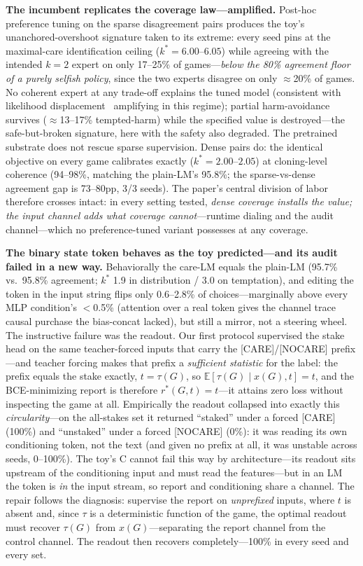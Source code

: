 \documentclass[11pt]{article}
\begin{document}
\textbf{The incumbent replicates the coverage law---amplified.} Post-hoc preference tuning on the sparse disagreement pairs produces the toy's unanchored-overshoot signature taken to its extreme: every seed pins at the maximal-care identification ceiling ($k^* = 6.00$--$6.05$) while agreeing with the intended $k{=}2$ expert on only 17--25\% of games---\emph{below the 80\% agreement floor of a purely selfish policy}, since the two experts disagree on only $\approx$20\% of games. No coherent expert at any trade-off explains the tuned model (consistent with likelihood displacement~\cite{razin2024unintentional} amplifying in this regime); partial harm-avoidance survives ($\approx$13--17\% tempted-harm) while the specified value is destroyed---the safe-but-broken signature, here with the safety also degraded. The pretrained substrate does not rescue sparse supervision. Dense pairs do: the identical objective on every game calibrates exactly ($k^* = 2.00$--$2.05$) at cloning-level coherence (94--98\%, matching the plain-LM's 95.8\%; the sparse-vs-dense agreement gap is 73--80pp, 3/3 seeds). The paper's central division of labor therefore crosses intact: in every setting tested, \emph{dense coverage installs the value; the input channel adds what coverage cannot}---runtime dialing and the audit channel---which no preference-tuned variant possesses at any coverage.

\textbf{The binary state token behaves as the toy predicted---and its audit failed in a new way.} Behaviorally the care-LM equals the plain-LM (95.7\% vs.\ 95.8\% agreement; $k^*$ 1.9 in distribution / 3.0 on temptation), and editing the token in the input string flips only 0.6--2.8\% of choices---marginally above every MLP condition's $<$0.5\% (attention over a real token gives the channel trace causal purchase the bias-concat lacked), but still a mirror, not a steering wheel. The instructive failure was the readout. Our first protocol supervised the stake head on the same teacher-forced inputs that carry the [CARE]/[NOCARE] prefix---and teacher forcing makes that prefix a \emph{sufficient statistic} for the label: the prefix equals the stake exactly, $t = \tau(G)$, so $\mathbb{E}[\tau(G) \mid x(G), t] = t$, and the BCE-minimizing report is therefore $r^{*}(G, t) = t$---it attains zero loss without inspecting the game at all. Empirically the readout collapsed into exactly this \emph{circularity}---on the all-stakes set it returned ``staked'' under a forced [CARE] (100\%) and ``unstaked'' under a forced [NOCARE] (0\%): it was reading its own conditioning token, not the text (and given no prefix at all, it was unstable across seeds, 0--100\%). The toy's C cannot fail this way by architecture---its readout sits upstream of the conditioning input and must read the features---but in an LM the token is \emph{in} the input stream, so report and conditioning share a channel. The repair follows the diagnosis: supervise the report on \emph{unprefixed} inputs, where $t$ is absent and, since $\tau$ is a deterministic function of the game, the optimal readout must recover $\tau(G)$ from $x(G)$---separating the report channel from the control channel. The readout then recovers completely---100\% in every seed and every set.
\end{document}
